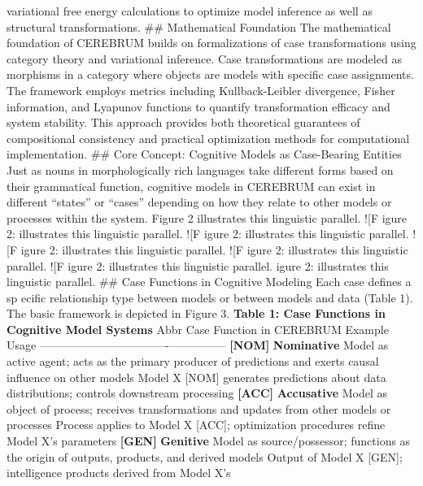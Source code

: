 \documentclass[
  11pt,
  letterpaper,
]{article}
\begin{document}
variational free energy calculations to optimize model inference as well
as structural transformations. \#\# Mathematical Foundation The
mathematical foundation of CEREBRUM builds on formalizations of case
transformations using category theory and variational inference. Case
transformations are modeled as morphisms in a category where objects are
models with specific case assignments. The framework employs metrics
including Kullback-Leibler divergence, Fisher information, and Lyapunov
functions to quantify transformation efficacy and system stability. This
approach provides both theoretical guarantees of compositional
consistency and practical optimization methods for computational
implementation. \#\# Core Concept: Cognitive Models as Case-Bearing
Entities Just as nouns in morphologically rich languages take different
forms based on their grammatical function, cognitive models in CEREBRUM
can exist in different ``states'' or ``cases'' depending on how they
relate to other models or processes within the system. Figure 2
illustrates this linguistic parallel. !{[}F igure 2: illustrates this
linguistic parallel. !{[}F igure 2: illustrates this linguistic
parallel. !{[}F igure 2: illustrates this linguistic parallel. !{[}F
igure 2: illustrates this linguistic parallel. !{[}F igure 2:
illustrates this linguistic parallel. igure 2: illustrates this
linguistic parallel. \#\# Case Functions in Cognitive Modeling Each case
defines a sp ecific relationship type between models or between models
and data (Table 1). The basic framework is depicted in Figure 3.
\textbf{Table 1: Case Functions in Cognitive Model Systems} \textbar{}
Abbr \textbar{} Case \textbar{} Function in CEREBRUM \textbar{} Example
Usage \textbar{}
\textbar------\textbar------\textbar----------------------\textbar---------------\textbar{}
\textbar{} \textbf{{[}NOM{]}} \textbar{} \textbf{Nominative} \textbar{}
Model as active agent; acts as the primary producer of predictions and
exerts causal influence on other models \textbar{} Model X {[}NOM{]}
generates predictions about data distributions; controls downstream
processing \textbar{} \textbar{} \textbf{{[}ACC{]}} \textbar{}
\textbf{Accusative} \textbar{} Model as object of process; receives
transformations and updates from other models or processes \textbar{}
Process applies to Model X {[}ACC{]}; optimization procedures refine
Model X's parameters \textbar{} \textbar{} \textbf{{[}GEN{]}} \textbar{}
\textbf{Genitive} \textbar{} Model as source/possessor; functions as the
origin of outputs, products, and derived models \textbar{} Output of
Model X {[}GEN{]}; intelligence products derived from Model X's
\end{document}
